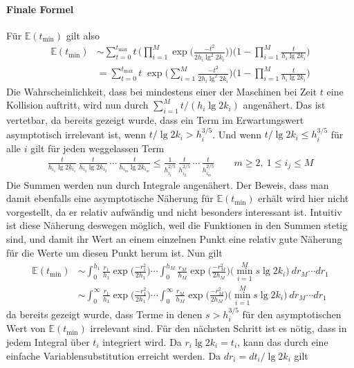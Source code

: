 \documentclass[a4paper, 10pt, ngerman]{article}
\newcommand{\E}{\mathbb{E}}
\begin{document}
\paragraph*{Finale Formel} Für $\E(t_{\min})$ gilt also
\begin{align*}
    \E(t_{\min})
     & \sim \sum_{t = 0}^{t_{\max}} t \, \Bigg ( \prod_{i = 1}^M \exp \bigg (\frac {-t^2} {2h_i \lg^2 2k_i} \bigg ) \Bigg ) \Bigg (1 - \prod_{i = 1}^M \frac {t} {h_i \lg 2k_i} \Bigg ) \\
     & = \sum_{t = 0}^{t_{\max}} t \; \exp \Bigg ( \sum_{i = 1}^M \frac {-t^2} {2h_i \lg^2 2k_i} \Bigg ) \Bigg (1 - \prod_{i = 1}^M \frac {t} {h_i \lg 2k_i} \Bigg )
\end{align*}
Die Wahrscheinlichkeit, dass bei mindestens einer der Maschinen bei Zeit $t$ eine Kollision auftritt, wird nun durch $\sum_{i = 1}^M t/(h_i \lg 2k_i)$ angenähert. Das ist vertetbar, da bereits gezeigt wurde, dass ein Term im Erwartungswert asymptotisch irrelevant ist, wenn $t/\lg 2k_i > h_i^{3/5}$. Und wenn $t / \lg 2k_i \le h_i^{3/5}$ für alle $i$ gilt für jeden weggelassen Term
\begin{align*}
    \frac {t} {h_{i_1} \lg 2k_{i_1}} \, \frac {t} {h_{i_2} \lg 2k_{i_2}} \, \cdots \, \frac {t} {h_{i_m} \lg 2k_{i_m}}
    \le \frac 1 {h_{i_1}^{2/5}} \, \frac {t} {h_{i_2}^{2/5}} \, \cdots \, \frac {t} {h_{i_m}^{2/5}} \qquad m \ge 2, \ 1 \le i_j \le M
\end{align*}
Die Summen werden nun durch Integrale angenähert. Der Beweis, dass man damit ebenfalls eine asymptotische Näherung für $\E(t_{\min})$ erhält wird hier nicht vorgestellt, da er relativ aufwändig und nicht besonders interessant ist. Intuitiv ist diese Näherung deswegen möglich, weil die Funktionen in den Summen stetig sind, und damit ihr Wert an einem einzelnen Punkt eine relativ gute Näherung für die Werte um diesen Punkt herum ist. Nun gilt
\begin{align*}
    \E(t_{\min})
     & \sim \int_{0}^{h_1} \frac {r_1} {h_1} \exp \bigg (\frac {-r_1^2} {2h_1} \bigg ) \cdots \int_{0}^{h_M} \frac {r_M} {h_M} \exp \bigg ( \frac {-r_M^2} {2h_M} \bigg ) \bigg ( \min_{i = 1}^M {s \lg 2k_i} \bigg ) \ d r_M \cdots dr_1        \\
     & \sim \int_{0}^{\infty} \frac {r_1} {h_1} \exp \bigg ( \frac {-r_1^2} {2h_1} \bigg ) \cdots \int_{0}^{\infty} \frac {r_M} {h_M} \exp \bigg ( \frac {-r_M^2} {2h_M} \bigg ) \bigg ( \min_{i = 1}^M {s \lg 2k_i} \bigg ) \ d r_M \cdots dr_1
\end{align*}
da bereits gezeigt wurde, dass Terme in denen $s > h_i^{3/5}$ für den asymptotischen Wert von $\E(t_{\min})$ irrelevant sind. Für den nächsten Schritt ist es nötig, dass in jedem Integral über $t_i$ integriert wird. Da $r_i \lg 2k_i = t_i$, kann das durch eine einfache Variablensubstitution erreicht werden. Da $ dr_i = dt_i / \lg 2k_i$ gilt
\end{document}
